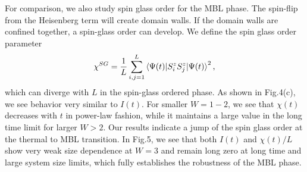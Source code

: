 \documentclass[prl,aps,epsf,showpacs,twocolumn,letterpaper]{revtex4}
\begin{document}
For comparison, we also study spin glass order for the MBL phase.  The spin-flip from the Heisenberg term will create domain walls.  If the domain walls are confined together, a spin-glass order can develop.  We define the spin glass order parameter 
\begin{equation}
\chi^{SG}=\frac 1 L \sum_{i,j=1}^L \braket{\Psi(t)|S_i^zS_j^z|\Psi(t)}^2 \text{,} \label{eq:sgo}
\end{equation}
which can diverge with $L$ in the spin-glass ordered phase.  As shown in Fig.4(c), we see behavior very similar  to $I(t)$.  For smaller $W=1-2$, we see that $\chi(t)$ decreases with $t$ in power-law fashion, while it maintains a large value in the long time limit for larger $W>2$.  Our results indicate a jump of the spin glass order at the thermal to MBL transition.  In Fig.5, we see that both $I(t)$ and $\chi(t)/L$ show very weak size dependence at $W=3$ and remain long zero at long time and large system size limits, which fully establishes the robustness of the MBL phase.  
\end{document}
